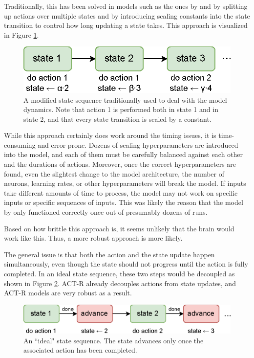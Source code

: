 \documentclass[10pt, a4paper, twocolumn]{article}
\begin{document}
Traditionally, this has been solved in models such as the ones by \cite{Aubin2016} and \cite{Praetorius} by splitting up actions over multiple states and by introducing scaling constants into the state transition to control how long updating a state takes. This approach is visualized in Figure \ref{fig:state-sequence-2}.

\begin{figure}[h]
	\centering
	\includegraphics[width=0.7\linewidth]{figures/state-sequence-2.eps}
	\caption{A modified state sequence traditionally used to deal with the model dynamics. Note that action 1 is performed both in state 1 and in state 2, and that every state transition is scaled by a constant.}
	\label{fig:state-sequence-2}
\end{figure}

While this approach certainly does work around the timing issues, it is time-consuming and error-prone. Dozens of scaling hyperparameters are introduced into the model, and each of them must be carefully balanced against each other and the durations of actions. Moreover, once the correct hyperparameters are found, even the slightest change to the model architecture, the number of neurons, learning rates, or other hyperparameters will break the model. If inputs take different amounts of time to process, the model may not work on specific inputs or specific sequences of inputs. This was likely the reason that the model by \cite{Praetorius} only functioned correctly once out of presumably dozens of runs.

Based on how brittle this approach is, it seems unlikely that the brain would work like this. Thus, a more robust approach is more likely. 

The general issue is that both the action and the state update happen simultaneously, even though the state should not progress until the action is fully completed. In an ideal state sequence, these two steps would be decoupled as shown in Figure \ref{fig:ideal-state-sequence}. ACT-R already decouples actions from state updates, and ACT-R models are very robust as a result.

\begin{figure}[h]
	\centering
	\includegraphics[width=0.9\linewidth]{figures/ideal-state-sequence.eps}
	\caption{An ``ideal" state sequence. The state advances only once the associated action has been completed.}
	\label{fig:ideal-state-sequence}
\end{figure}
\end{document}

